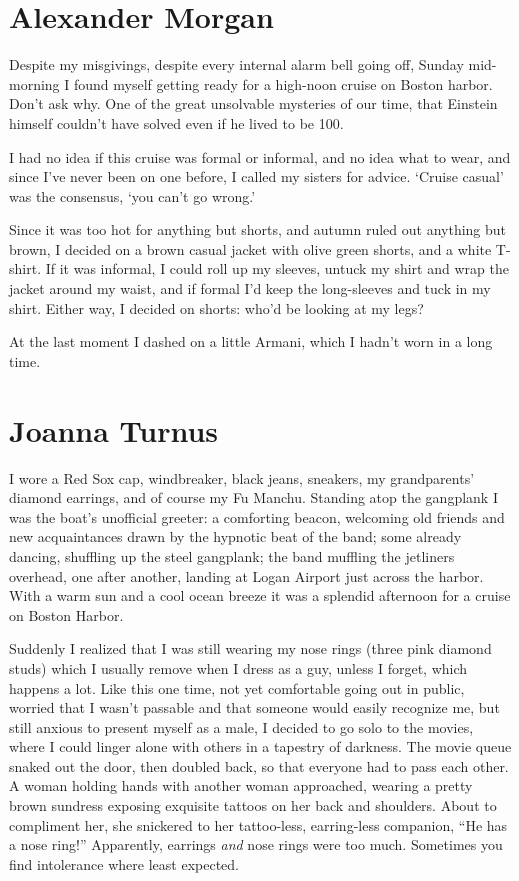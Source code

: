 \chapter{Alexander Morgan}

\titlemark

Despite my misgivings, despite every internal alarm bell going off,
Sunday mid-morning I found myself getting ready for a high-noon cruise
on Boston harbor. Don't ask why. One of the great unsolvable mysteries
of our time, that Einstein himself couldn't have solved even if he lived
to be 100.

I had no idea if this cruise was formal or informal, and no idea what to
wear, and since I've never been on one before, I called my sisters for
advice. `Cruise casual' was the consensus, `you can't go wrong.'

Since it was too hot for anything but shorts, and autumn ruled out
anything but brown, I decided on a brown casual jacket with olive green
shorts, and a white T-shirt. If it was informal, I could roll up my
sleeves, untuck my shirt and wrap the jacket around my waist, and if
formal I'd keep the long-sleeves and tuck in my shirt. Either way, I
decided on shorts: who'd be looking at my legs?

At the last moment I dashed on a little Armani, which I hadn't worn in a
long time.

\chapter{Joanna Turnus}

\titlemark

I wore a Red Sox cap, windbreaker, black jeans, sneakers, my
grandparents' diamond earrings, and of course my Fu Manchu. Standing
atop the gangplank I was the boat's unofficial greeter: a comforting
beacon, welcoming old friends and new acquaintances drawn by the
hypnotic beat of the band; some already dancing, shuffling up the steel
gangplank; the band muffling the jetliners overhead, one after another,
landing at Logan Airport just across the harbor. With a warm sun and a
cool ocean breeze it was a splendid afternoon for a cruise on Boston
Harbor.

Suddenly I realized that I was still wearing my nose rings (three pink
diamond studs) which I usually remove when I dress as a guy, unless I
forget, which happens a lot. Like this one time, not yet comfortable
going out in public, worried that I wasn't passable and that someone
would easily recognize me, but still anxious to present myself as a
male, I decided to go solo to the movies, where I could linger alone
with others in a tapestry of darkness. The movie queue snaked out the
door, then doubled back, so that everyone had to pass each other. A
woman holding hands with another woman approached, wearing a pretty
brown sundress exposing exquisite tattoos on her back and shoulders.
About to compliment her, she snickered to her tattoo-less, earring-less
companion, ``He has a nose ring!'' Apparently, earrings \emph{and} nose
rings were too much. Sometimes you find intolerance where least
expected.

